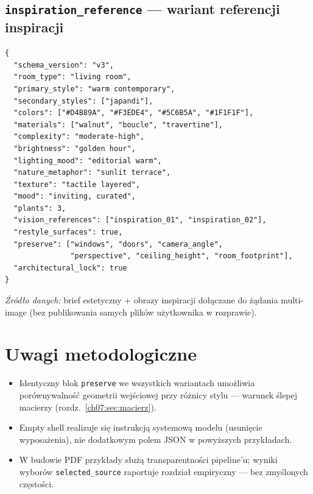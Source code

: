 \subsection{\texttt{inspiration\_reference} --- wariant referencji inspiracji}
\label{app:d:sec:inspiration}

\begin{lstlisting}
{
  "schema_version": "v3",
  "room_type": "living room",
  "primary_style": "warm contemporary",
  "secondary_styles": ["japandi"],
  "colors": ["#D4B89A", "#F3EDE4", "#5C6B5A", "#1F1F1F"],
  "materials": ["walnut", "boucle", "travertine"],
  "complexity": "moderate-high",
  "brightness": "golden hour",
  "lighting_mood": "editorial warm",
  "nature_metaphor": "sunlit terrace",
  "texture": "tactile layered",
  "mood": "inviting, curated",
  "plants": 3,
  "vision_references": ["inspiration_01", "inspiration_02"],
  "restyle_surfaces": true,
  "preserve": ["windows", "doors", "camera_angle",
               "perspective", "ceiling_height", "room_footprint"],
  "architectural_lock": true
}
\end{lstlisting}

\noindent\textit{Źródło danych:} brief estetyczny + obrazy inspiracji dołączane do żądania multi-image (bez publikowania samych plików użytkownika w rozprawie).

\section{Uwagi metodologiczne}
\label{app:d:sec:uwagi}

\begin{itemize}
  \item Identyczny blok \texttt{preserve} we wszystkich wariantach umożliwia porównywalność geometrii wejściowej przy różnicy stylu --- warunek ślepej macierzy (rozdz.~\ref{ch07:sec:macierz}).
  \item Empty shell realizuje się instrukcją systemową modelu (usunięcie wyposażenia), nie dodatkowym polem JSON w powyższych przykładach.
  \item W budowie PDF przykłady służą transparentności pipeline’u; wyniki wyborów \texttt{selected\_source} raportuje rozdział empiryczny --- bez zmyślonych częstości.
\end{itemize}
